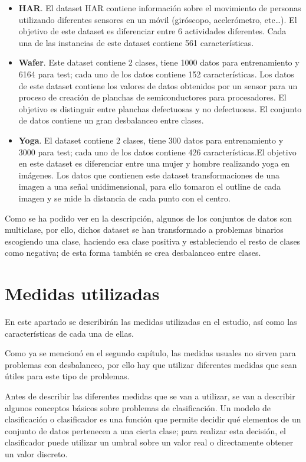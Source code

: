 \begin{itemize}
	\item \textbf{HAR}. El dataset HAR contiene información sobre el movimiento de personas utilizando diferentes sensores en un móvil (giróscopo, acelerómetro, etc…). El objetivo de este dataset es diferenciar entre 6 actividades diferentes. Cada una de las instancias de este dataset contiene 561 características.
	\item \textbf{Wafer}. Este dataset contiene 2 clases, tiene 1000 datos para entrenamiento y 6164 para test; cada uno de los datos contiene 152 características. Los datos de este dataset contiene los valores de datos obtenidos por un sensor para un proceso de creación de planchas de semiconductores para procesadores. El objetivo es distinguir entre planchas defectuosas y no defectuosas. El conjunto de datos contiene un gran desbalanceo entre clases.
	\item \textbf{Yoga}. El dataset contiene 2 clases, tiene 300 datos para entrenamiento y 3000 para test; cada uno de los datos contiene 426 características.El objetivo en este dataset es diferenciar entre una mujer y hombre realizando yoga en imágenes. Los datos que contienen este dataset transformaciones de una imagen a una señal unidimensional, para ello tomaron el outline de cada imagen y se mide la distancia de cada punto con el centro.
\end{itemize}
\verticalspace

Como se ha podido ver en la descripción, algunos de los conjuntos de datos son multiclase, por ello, dichos dataset se han transformado a problemas binarios escogiendo una clase, haciendo esa clase positiva y estableciendo el resto de clases como negativa; de esta forma también se crea desbalanceo entre clases.\newline

\section{Medidas utilizadas}
En este apartado se describirán las medidas utilizadas en el estudio, así como las características de cada una de ellas.\newline

Como ya se mencionó en el segundo capítulo, las medidas usuales no sirven para problemas con desbalanceo, por ello hay que utilizar diferentes medidas que sean útiles para este tipo de problemas.\newline

Antes de describir las diferentes medidas que se van a utilizar, se van a describir algunos conceptos básicos sobre problemas de clasificación. Un modelo de clasificación o clasificador es una función que permite decidir qué elementos de un conjunto de datos pertenecen a una cierta clase; para realizar esta decisión, el clasificador puede utilizar un umbral sobre un valor real o directamente obtener un valor discreto.\newline


